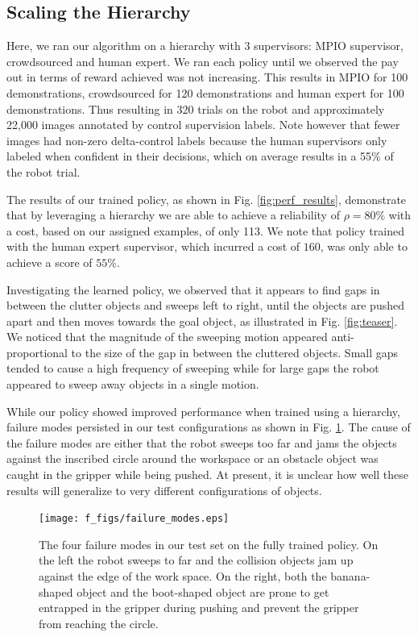 \documentclass[10pt, conference]{ieeeconf}      %
\begin{document}
\subsection{Scaling the Hierarchy}
Here, we ran our algorithm on a hierarchy with 3 supervisors: MPIO supervisor, crowdsourced and human
expert. We ran each policy until we observed the pay out in terms of reward achieved was not increasing. This results in
MPIO for 100 demonstrations, crowdsourced for 120 demonstrations and human expert for 100 demonstrations. Thus resulting
in 320 trials on the robot and approximately 22,000 images annotated by control supervision labels. Note however that
fewer images had non-zero delta-control labels because the human supervisors only labeled when confident in their
decisions, which on average results in a 55\% of the robot trial. 

The results of our trained policy, as shown in Fig. \ref{fig:perf_results}, demonstrate that by leveraging a hierarchy we are able to achieve a reliability of $\rho=80\%$ with a cost, based on our assigned examples, of only 113. We note that policy trained with the human expert supervisor, which incurred a cost of $160$, was only able to achieve a score of $55\%$. 

Investigating the learned policy, we observed that it appears to find gaps in between the clutter objects and sweeps
left to right,  until the objects are pushed apart and then moves towards the goal object, as illustrated in Fig.
\ref{fig:teaser}. We noticed that the magnitude of the sweeping motion appeared anti-proportional to the size of the gap in
 between the cluttered objects. Small gaps tended to cause a high frequency of sweeping while for large gaps the
robot appeared to sweep away objects in a single motion.

While our policy showed improved performance when trained using a hierarchy, failure modes persisted in our test
configurations as shown in Fig. \ref{fig:failure_modes}. The cause of the failure modes are either that the robot
sweeps too far and jams the objects against the inscribed circle around the workspace or an obstacle object was caught
in the gripper while being pushed. At present, it is unclear how well these results will generalize to very different configurations 
of objects.

\begin{figure}[t]
\centering 
\texttt{[image: f\_figs/failure\_modes.eps]}

\caption{\footnotesize The four failure modes in our test set on the fully trained policy. On the left the robot sweeps
to far and the collision objects jam up against the edge of the work space. On the right, both the banana-shaped object
and the boot-shaped object are prone to get entrapped in the gripper during pushing and prevent the gripper from reaching the circle.  }
\label{fig:failure_modes}
\end{figure}
\end{document}
